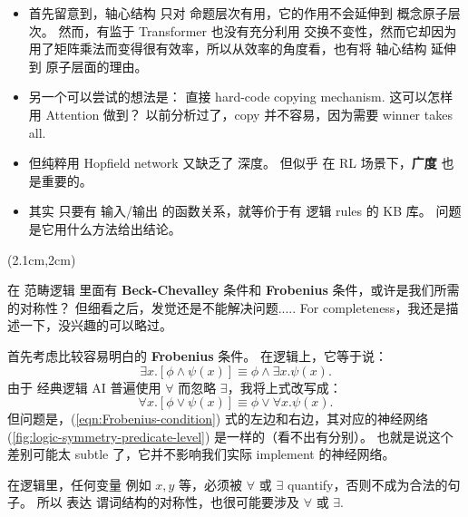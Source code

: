 \begin{preview}
\begin{minipage}{\textwidth}
\begin{itemize}
	\item 首先留意到，轴心结构 只对 命题层次有用，它的作用不会延伸到 概念原子层次。 然而，有监于 Transformer 也没有充分利用 交换不变性，然而它却因为用了矩阵乘法而变得很有效率，所以从效率的角度看，也有将 轴心结构 延伸到 原子层面的理由。

	\item 另一个可以尝试的想法是： 直接 hard-code copying mechanism.  这可以怎样用 Attention 做到？  以前分析过了，copy 并不容易，因为需要 winner takes all.

	\item 但纯粹用 Hopfield network 又缺乏了 深度。 但似乎 在 RL 场景下，\textbf{广度} 也是重要的。
	
	\item 其实 只要有 输入/输出 的函数关系，就等价于有 逻辑 rules 的 KB 库。 问题是它用什么方法给出结论。
\end{itemize}

\end{minipage}
\end{preview}


\begin{preview}
\begin{minipage}{\textwidth}

\setlength{\parskip}{0.4\baselineskip}
\begin{textblock*}{20cm}(2.1cm,2cm) %
	{}
	\hspace{8cm}
\end{textblock*}
\vspace*{0.3cm} 

在 范畴逻辑 里面有 \textbf{Beck-Chevalley} 条件和 \textbf{Frobenius} 条件，或许是我们所需的对称性？ 但细看之后，发觉还是不能解决问题.....  For completeness，我还是描述一下，没兴趣的可以略过。

首先考虑比较容易明白的 \textbf{Frobenius} 条件。 在逻辑上，它等于说：
\begin{equation}
\exists x. [ \phi \wedge \psi(x) ] \equiv \phi \wedge \exists x. \psi(x).
\end{equation}
由于 经典逻辑 AI 普遍使用 $\forall$ 而忽略 $\exists$，我将上式改写成：
\begin{equation}
\label{eqn:Frobenius-condition}
\forall x. [ \phi \vee \psi(x) ] \equiv \phi \vee \forall x. \psi(x).
\end{equation}
但问题是，(\ref{eqn:Frobenius-condition}) 式的左边和右边，其对应的神经网络 (\ref{fig:logic-symmetry-predicate-level}) 是一样的（看不出有分别）。 也就是说这个差别可能太 subtle 了，它并不影响我们实际 implement 的神经网络。

在逻辑里，任何变量 例如 $x,y$ 等，必须被 $\forall$ 或 $\exists$ quantify，否则不成为合法的句子。 所以 表达 谓词结构的对称性，也很可能要涉及 $\forall$ 或 $\exists$.

\end{minipage}
\end{preview}

